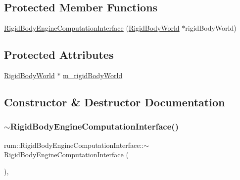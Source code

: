 \subsection*{Protected Member Functions}
\begin{DoxyCompactItemize}
\item 
\mbox{\hyperlink{classrum_1_1_rigid_body_engine_computation_interface_a98e43d0c0c3d436f887c54ffc906edda}{Rigid\+Body\+Engine\+Computation\+Interface}} (\mbox{\hyperlink{classrum_1_1_rigid_body_world}{Rigid\+Body\+World}} $\ast$rigid\+Body\+World)
\end{DoxyCompactItemize}
\subsection*{Protected Attributes}
\begin{DoxyCompactItemize}
\item 
\mbox{\hyperlink{classrum_1_1_rigid_body_world}{Rigid\+Body\+World}} $\ast$ \mbox{\hyperlink{classrum_1_1_rigid_body_engine_computation_interface_a0fe8954d9cc967383a4835c87d13c236}{m\+\_\+rigid\+Body\+World}}
\end{DoxyCompactItemize}


\subsection{Constructor \& Destructor Documentation}
\mbox{\label{classrum_1_1_rigid_body_engine_computation_interface_ae707ec2510b8da565bf7604770b0ef22}} 
\subsubsection{\texorpdfstring{$\sim$\+Rigid\+Body\+Engine\+Computation\+Interface()}{~RigidBodyEngineComputationInterface()}}
{\footnotesize\ttfamily rum\+::\+Rigid\+Body\+Engine\+Computation\+Interface\+::$\sim$\+Rigid\+Body\+Engine\+Computation\+Interface (\begin{DoxyParamCaption}{ }\end{DoxyParamCaption})\hspace{0.3cm}{\ttfamily [virtual]}, {\ttfamily [default]}}


